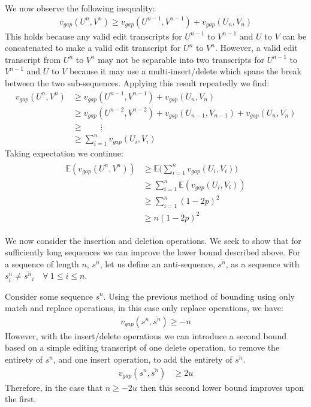 \documentclass[a4paper]{article}
\begin{document}
We now observe the following inequality:
\begin{align*}
     v_{gap}(U^n,V^n) \geq v_{gap}(U^{n-1},V^{n-1}) + v_{gap}(U_n,V_n)
\end{align*}
This holds because any valid edit transcripts for $U^{n-1}$ to $V^{n-1}$ and $U$ to $V$ can be concatenated to make a valid edit transcript for $U^n$ to $V^n$. However, a valid edit transcript from $U^n$ to $V^n$ may not be separable into two transcripts for $U^{n-1}$ to $V^{n-1}$ and $U$ to $V$ because it may use a multi-insert/delete which spans the break between the two sub-sequences. Applying this result repeatedly we find:
\begin{align*}
     v_{gap}(U^n,V^n) &\geq v_{gap}(U^{n-1},V^{n-1}) + v_{gap}(U_n,V_n) \\
                      &\geq v_{gap}(U^{n-2},V^{n-2}) + v_{gap}(U_{n-1},V_{n-1}) + v_{gap}(U_n,V_n) \\
                      &\geq \qquad \vdots \\
                      &\geq \sum_{i=1}^n v_{gap}(U_i,V_i)
\end{align*}
Taking expectation we continue:
\begin{align}\label{eq7a}
\begin{split}
     \mathbb{E}(v_{gap}(U^n,V^n)) &\geq \mathbb{E}\big(\sum_{i=1}^n v_{gap}(U_i,V_i)\big) \\
                                  &\geq \sum_{i=1}^n \mathbb{E}(v_{gap}(U_i,V_i)) \\
                                  &\geq \sum_{i=1}^n (1-2p)^2 \\
                                  &\geq n(1-2p)^2
\end{split}
\end{align}

We now consider the insertion and deletion operations. We seek to show that for sufficiently long sequences we can improve the lower bound described above. For a sequence of length $n$, $s^n$, let us define an anti-sequence, $\overline{s^n}$, as a sequence with $s^n_i \neq \overline{s^n}_i \quad \forall\ 1\leq i\leq n$.

\bigskip
Consider some sequence $s^n$. Using the previous method of bounding using only match and replace operations, in this case only replace operations, we have:
\begin{align}\label{eq7b}
    v_{gap}(s^n, \overline{s^n}) \geq -n
\end{align}
However, with the insert/delete operations we can introduce a second bound based on a simple editing transcript of one delete operation, to remove the entirety of $s^n$, and one insert operation, to add the entirety of $\overline{s^n}$.
\begin{align}\label{eq7c}
    v_{gap}(s^n, \overline{s^n}) &\geq 2u
\end{align}
Therefore, in the case that $n\geq -2u$ then this second lower bound improves upon the first.
\end{document}
